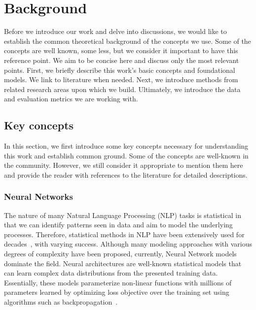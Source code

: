 \chapter{Background}%
\label{chap:background}
Before we introduce our work and delve into discussions, we would like to establish the common theoretical background of the concepts we use.
Some of the concepts are well known, some less, but we consider it important to have this reference point.
We aim to be concise here and discuss only the most relevant points.
First, we briefly describe this work's basic concepts and foundational models.
We link to literature when needed.
Next, we introduce methods from related research areas upon which we build.
Ultimately, we introduce the data and evaluation metrics we are working with.

\section{Key concepts}
\label{02:sec:basics}
In this section, we first introduce some key concepts necessary for understanding this work and establish common ground.
Some of the concepts are well-known in the community.
However, we still consider it appropriate to mention them here and provide the reader with references to the literature for detailed descriptions.

\subsection{Neural Networks}
\label{background:nns}
The nature of many Natural Language Processing (NLP) tasks is statistical in that we can identify patterns seen in data and aim to model the underlying processes.
Therefore, statistical methods in NLP have been extensively used for decades~\cite{manning99foundations}, with varying success.
Although many modeling approaches with various degrees of complexity have been proposed, currently, Neural Network models dominate the field.
Neural architectures are well-known statistical models \cite{GoodBengCour16} that can learn complex data distributions from the presented training data.
Essentially, these models parameterize non-linear functions with millions of parameters learned by optimizing loss objective over the training set using algorithms such as backpropagation~\cite{kelley1960gradient}.

